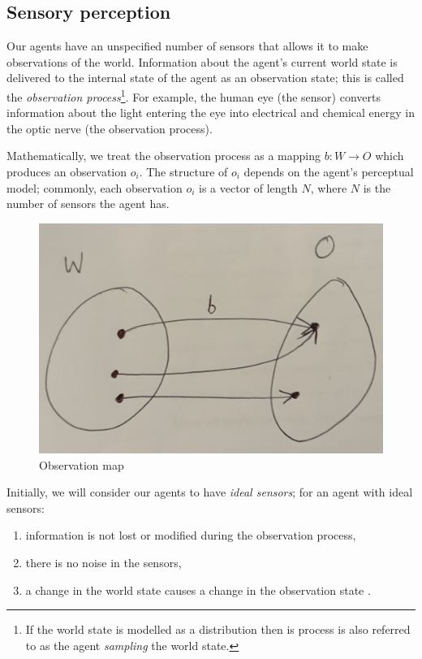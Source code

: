 \subsection{Sensory perception}

Our agents have an unspecified number of sensors that allows it to make observations of the world.
Information about the agent's current world state is delivered to the internal state of the agent as an observation state; this is called the \emph{observation process}\footnote{If the world state is modelled as a distribution then is process is also referred to as the agent \emph{sampling} the world state.}.
For example, the human eye (the sensor) converts information about the light entering the eye into
electrical and chemical energy in the optic nerve (the observation process).

Mathematically, we treat the observation process as a mapping $b: W \to O$ which produces an observation $o_{i}$.
The structure of $o_{i}$ depends on the agent's perceptual model; commonly, each observation $o_{i}$ is a vector of length $N$, where $N$ is the number of sensors the agent has.

\begin{figure}
	\centering
	\includegraphics[width=0.5\linewidth]{2MathematicalFramework/Images/observation_process_W_to_O.jpeg}
	\caption{
		Observation map
	}
	\label{fig:observation_process_W_to_O}
\end{figure}

Initially, we will consider our agents to have \emph{ideal sensors}; for an agent with ideal sensors:
\begin{enumerate}
	\item information is not lost or modified during the observation process,
	\item there is no noise in the sensors,
	\item a change in the world state causes a change in the observation state  .
\end{enumerate}

